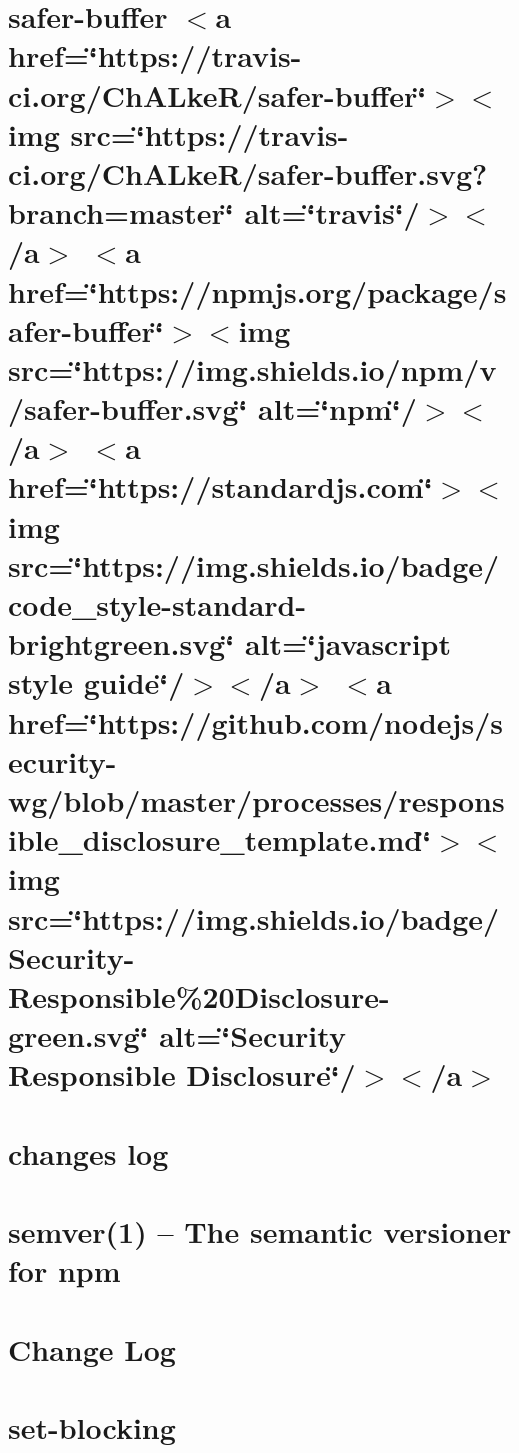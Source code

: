 \let\mypdfximage\pdfximage\def\pdfximage{\immediate\mypdfximage}\documentclass[twoside]{book}
\newcommand{\+}{\discretionary{\mbox{\scriptsize$\hookleftarrow$}}{}{}}
\begin{document}
\chapter{safer-\/buffer $<$a href=\char`\"{}https\+://travis-\/ci.\+org/\+Ch\+A\+Lke\+R/safer-\/buffer\char`\"{}$>$$<$img src=\char`\"{}https\+://travis-\/ci.\+org/\+Ch\+A\+Lke\+R/safer-\/buffer.\+svg?branch=master\char`\"{} alt=\char`\"{}travis\char`\"{}/$>$$<$/a$>$ $<$a href=\char`\"{}https\+://npmjs.\+org/package/safer-\/buffer\char`\"{}$>$$<$img src=\char`\"{}https\+://img.\+shields.\+io/npm/v/safer-\/buffer.\+svg\char`\"{} alt=\char`\"{}npm\char`\"{}/$>$$<$/a$>$ $<$a href=\char`\"{}https\+://standardjs.\+com\char`\"{}$>$$<$img src=\char`\"{}https\+://img.\+shields.\+io/badge/code\+\_\+style-\/standard-\/brightgreen.\+svg\char`\"{} alt=\char`\"{}javascript style guide\char`\"{}/$>$$<$/a$>$ $<$a href=\char`\"{}https\+://github.\+com/nodejs/security-\/wg/blob/master/processes/responsible\+\_\+disclosure\+\_\+template.\+md\char`\"{}$>$$<$img src=\char`\"{}https\+://img.\+shields.\+io/badge/\+Security-\/\+Responsible\%20\+Disclosure-\/green.\+svg\char`\"{} alt=\char`\"{}\+Security Responsible Disclosure\char`\"{}/$>$$<$/a$>$}
\label{md_heap-visualizer_node_modules_safer-buffer__readme}

\chapter{changes log}
\label{md_heap-visualizer_node_modules_semver__c_h_a_n_g_e_l_o_g}

\chapter{semver(1) -- The semantic versioner for npm}
\label{md_heap-visualizer_node_modules_semver__r_e_a_d_m_e}

\chapter{Change Log}
\label{md_heap-visualizer_node_modules_set-blocking__c_h_a_n_g_e_l_o_g}

\chapter{set-\/blocking}
\label{md_heap-visualizer_node_modules_set-blocking__r_e_a_d_m_e}

\end{document}
